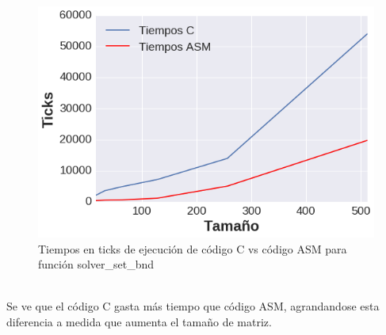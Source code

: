 \begin{figure}[h]

\centering
\includegraphics[scale=0.6] {grafica_set_bound}
  
 \caption{Tiempos en ticks de ejecución de código C vs código ASM para función solver\_set\_bnd}
\end{figure} \\
Se ve que el código C gasta más tiempo que código ASM, agrandandose esta diferencia a medida que aumenta el tamaño de matriz.

